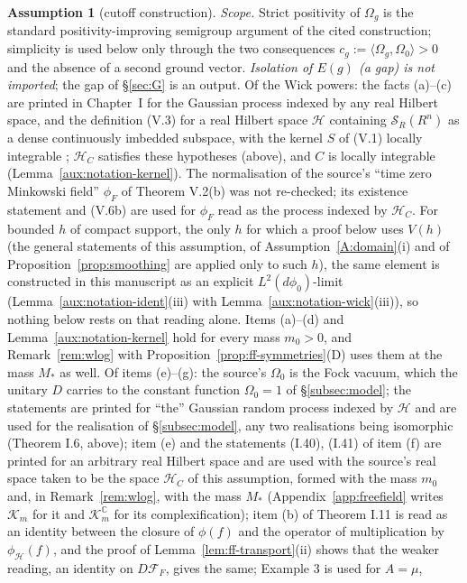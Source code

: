 \documentclass[11pt,a4paper]{article}
\theoremstyle{plain}
\theoremstyle{definition}
\newtheorem{assumption}{Assumption}
\theoremstyle{plain}
\theoremstyle{definition}
\newcommand{\C}{\mathbb{C}}
\newcommand{\HH}{\mathcal{H}}
\newcommand{\Om}{\Omega}
\newcommand{\ip}[2]{\langle #1,#2\rangle}
\begin{document}
\begin{assumption}[cutoff construction]
\emph{Scope.} Strict positivity of $\Om_g$ is the standard positivity-improving semigroup
argument of the cited construction; simplicity is used below only through the two consequences
$c_g:=\ip{\Om_g}{\Om_0}>0$ and the absence of a second ground vector. \emph{Isolation of
$E(g)$ (a gap) is not imported}; the gap of \S\ref{sec:G} is an output.
Of the Wick powers: the facts (a)--(c) are printed in Chapter~I for the Gaussian process
indexed by any real Hilbert space, and the definition (V.3) for a real Hilbert space
$\mathcal H$ containing $\mathcal S_R(R^n)$ as a dense continuously imbedded subspace, with the
kernel $S$ of (V.1) locally integrable \cite[pp.~134--135]{SimonBook}; $\HH_C$ satisfies these
hypotheses (above), and $C$ is locally integrable (Lemma~\ref{aux:notation-kernel}).  The
normalisation of the source's ``time zero Minkowski field'' $\phi_F$ of Theorem V.2(b) was not
re-checked; its existence statement and (V.6b) are used for $\phi_F$ read as the process
indexed by $\HH_C$.  For bounded $h$ of compact support, the only $h$ for which a proof below
uses $V(h)$ (the general statements of this assumption, of Assumption~\ref{A:domain}(i) and of
Proposition~\ref{prop:smoothing} are applied only to such $h$), the same
element is constructed in this manuscript as an explicit $L^2(d\phi_0)$-limit
(Lemma~\ref{aux:notation-ident}(iii) with Lemma~\ref{aux:notation-wick}(iii)), so nothing
below rests on that reading alone.  Items (a)--(d) and Lemma~\ref{aux:notation-kernel} hold
for every mass $m_0>0$, and Remark~\ref{rem:wlog} with Proposition~\ref{prop:ff-symmetries}(D)
uses them at the mass $M_*$ as well.  Of items (e)--(g): the source's $\Omega_0$ is the Fock
vacuum, which the unitary $D$ carries to the constant function $\Om_0=1$ of
\S\ref{subsec:model}; the statements are printed for ``the'' Gaussian random process indexed by
$\mathcal H$ and are used for the realisation of \S\ref{subsec:model}, any two realisations
being isomorphic (Theorem I.6, above); item (e) and the statements (I.40),
(I.41) of item (f) are printed for an arbitrary real Hilbert space and are used with the
source's real space taken to be the space $\HH_C$ of this assumption, formed with the mass
$m_0$ and, in Remark~\ref{rem:wlog}, with the mass $M_*$ (Appendix~\ref{app:freefield} writes
$\mathcal K_m$ for it and $\mathcal K_m^{\C}$ for its complexification); item (b) of Theorem I.11 is read as an identity
between the closure of $\phi(f)$ and the operator of multiplication by
$\phi_{\mathcal H}(f)$, and the proof of Lemma~\ref{lem:ff-transport}(ii) shows that the
weaker reading, an identity on $D\mathcal F_F$, gives the same; Example 3 is used for $A=\mu$,

\end{assumption}
\end{document}

